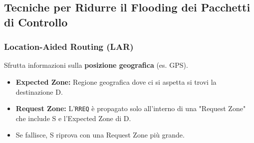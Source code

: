 \subsection{Tecniche per Ridurre il Flooding dei Pacchetti di Controllo}
\subsubsection{Location-Aided Routing (LAR)}
Sfrutta informazioni sulla \textbf{posizione geografica} (es. GPS).
\begin{itemize}
    \item \textbf{Expected Zone:} Regione geografica dove ci si aspetta si trovi la destinazione D.
    \item \textbf{Request Zone:} L'\texttt{RREQ} è propagato solo all'interno di una "Request Zone" che include S e l'Expected Zone di D.
    \item Se fallisce, S riprova con una Request Zone più grande.
\end{itemize}

